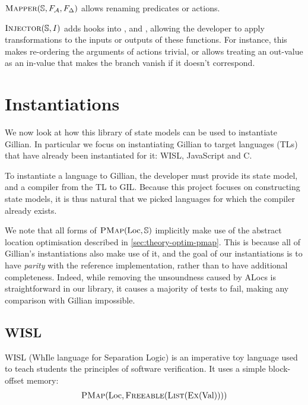 $\textsc{Mapper}(\mathbb S, F_{\cal{A}}, F_\Delta)$ allows renaming predicates or actions.

$\textsc{Injector}(\mathbb S, I)$ adds hooks into \consume, \produce{} and \execac{}, allowing the developer to apply transformations to the inputs or outputs of these functions. For instance, this makes re-ordering the arguments of actions trivial, or allows treating an out-value as an in-value that makes the branch vanish if it doesn't correspond.

\section{Instantiations} \label{sec:impl-instantiations}

We now look at how this library of state models can be used to instantiate Gillian. In particular we focus on instantiating Gillian to target languages (TLs) that have already been instantiated for it: WISL, JavaScript and C.

To instantiate a language to Gillian, the developer must provide its state model, and a compiler from the TL to GIL. Because this project focuses on constructing state models, it is thus natural that we picked languages for which the compiler already exists.

We note that all forms of $\textsc{PMap}(\text{Loc}, \mathbb S)$ implicitly make use of the abstract location optimisation described in \cref{sec:theory-optim-pmap}. This is because all of Gillian's instantiations also make use of it, and the goal of our instantiations is to have \emph{parity} with the reference implementation, rather than to have additional completeness. Indeed, while removing the unsoundness caused by ALocs is straightforward in our library, it causes a majority of tests to fail, making any comparison with Gillian impossible.

\subsection{WISL}

WISL (WhIle language for Separation Logic) is an imperative toy language used to teach students the principles of software verification. It uses a simple block-offset memory: \begin{align*}
 	\textsc{PMap}(\text{Loc}, \textsc{Freeable}(\textsc{List}(\textsc{Ex}(\text{Val}))))
\end{align*}

